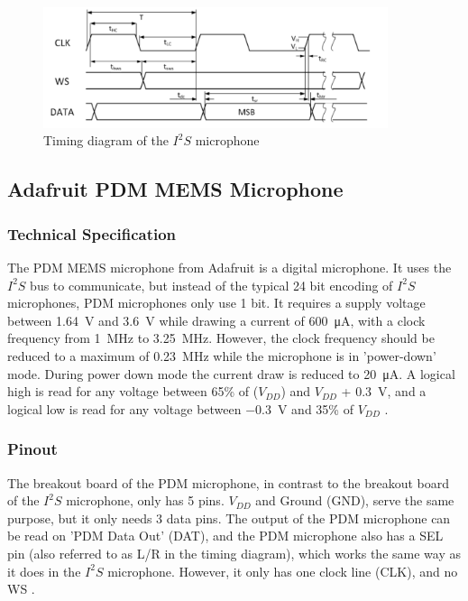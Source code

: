 \begin{figure}[htb]
    \centering
    \includegraphics[width=0.9\textwidth]{figures/i2s_timing.png}
    \caption[Timing diagram of the SPH0645LM4H-B $I^2S$ mic \cite{i2s_mic_datasheet}]{Timing diagram of the $I^2S$ microphone}
    \label{fig:i2s_timing}
\end{figure}

\subsection{Adafruit PDM MEMS Microphone}

\subsubsection{Technical Specification}

The PDM MEMS microphone from Adafruit \cite{pdm_mic} is a digital microphone.
It uses the $I^2S$ bus to communicate, but instead of the typical 24 bit encoding of $I^2S$ microphones, PDM microphones only use 1 bit.
It requires a supply voltage between \SI{1.64}{\volt} and \SI{3.6}{\volt} while drawing a current of \SI{600}{\micro\ampere}, with a clock
frequency from \SI{1}{\mega\hertz} to \SI{3.25}{\mega\hertz}.
However, the clock frequency should be reduced to a maximum of \SI{0.23}{\mega\hertz} while the microphone is in 'power-down' mode.
During power down mode the current draw is reduced to \SI{20}{\micro\ampere}.
A logical high is read for any voltage between 65\% of ($V_{DD}$) and $V_{DD}$ + \SI{0.3}{\volt},
and a logical low is read for any voltage between \SI{-0.3}{\volt} and 35\% of $V_{DD}$ \cite{pdm_mic_datasheet}.

\subsubsection{Pinout}

The breakout board of the PDM microphone, in contrast to the breakout board of the $I^2S$ microphone, only has 5 pins.
$V_{DD}$ and Ground (GND), serve the same purpose, but it only needs 3 data pins.
The output of the PDM microphone can be read on 'PDM Data Out' (DAT), and the PDM microphone also has a SEL pin (also referred to as L/R in the timing diagram),
which works the same way as it does in the $I^2S$ microphone.
However, it only has one clock line (CLK), and no WS \cite{pdm_mic_pinout}.

